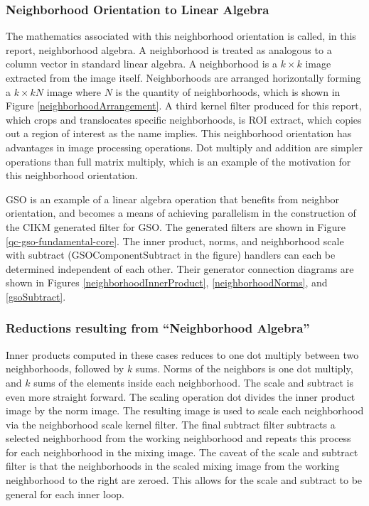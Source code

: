 \documentclass[11pt]{article}
\begin{document}
\subsubsection{Neighborhood Orientation to Linear Algebra}
The mathematics associated with this neighborhood orientation is called, in this report, neighborhood algebra.   A neighborhood is treated as analogous to a column vector in standard linear algebra.  A neighborhood is a $k \times k$ image extracted from the image itself.  Neighborhoods are arranged horizontally forming a $k \times kN$ image where $N$ is the quantity of neighborhoods, which is shown in Figure \ref{neighborhoodArrangement}.  %
A third kernel filter produced for this report, which crops and translocates specific neighborhoods, is ROI extract, which copies out a region of interest as the name implies.  This neighborhood orientation has advantages in image processing operations.  Dot multiply and addition are simpler operations than full matrix multiply, which is an example of the motivation for this neighborhood orientation.   


GSO is an example of a linear algebra operation that benefits from neighbor orientation, and becomes a means of achieving parallelism in the construction of the CIKM generated filter for GSO.   The generated filters are shown in Figure \ref{qc-gso-fundamental-core}.   The inner product, norms, and neighborhood scale with subtract (GSOComponentSubtract in the figure) handlers can each be determined independent of each other.  Their generator connection diagrams are shown in Figures \ref{neighborhoodInnerProduct}, \ref{neighborhoodNorms}, and \ref{gsoSubtract}.

\subsubsection{Reductions resulting from ``Neighborhood Algebra''}
Inner products computed in these cases reduces to one dot multiply between two neighborhoods, followed by $k$ sums.   Norms of the neighbors is one dot multiply, and $k$ sums of the elements inside each neighborhood. The scale and subtract is even more straight forward.  The scaling operation dot divides the inner product image by the norm image.  The resulting image is used to scale each neighborhood via the neighborhood scale kernel filter.  The final subtract filter subtracts a selected neighborhood from the working neighborhood and repeats this process for each neighborhood in the mixing image.  The caveat of the scale and subtract filter is that the neighborhoods in the scaled mixing image from the working neighborhood to the right are zeroed.  This allows for the scale and subtract to be general for each inner loop.  
\end{document}

